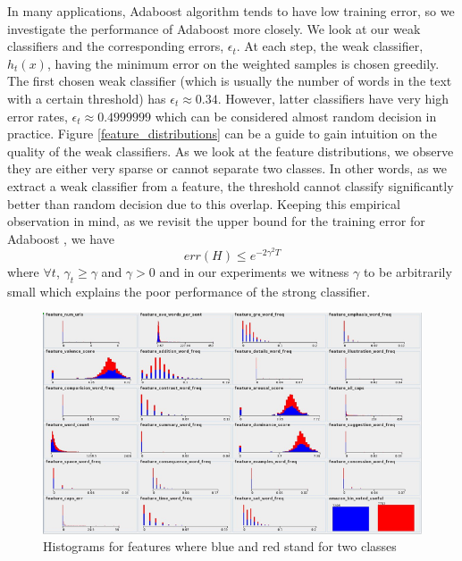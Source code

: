 \documentclass[letterpaper]{article}
\begin{document}
In many applications, Adaboost algorithm tends to have low training
error, so we investigate the performance of Adaboost more closely. We
look at our weak classifiers and the corresponding errors,
$\epsilon_t$. At each step, the weak classifier, $h_t(x)$, having the
minimum error on the weighted samples is chosen greedily. The first
chosen weak classifier (which is usually the number of words in the
text with a certain threshold) has $\epsilon_t \approx 0.34$. However,
latter classifiers have very high error rates, $\epsilon_t \approx
0.4999999$ which can be considered almost random decision in
practice. Figure \ref{feature_distributions} can be a guide to gain
intuition on the quality of the weak classifiers. As we look at the
feature distributions, we observe they are either very sparse or
cannot separate two classes. In other words, as we extract a weak
classifier from a feature, the threshold cannot classify significantly
better than random decision due to this overlap. Keeping this
empirical observation in mind, as we revisit the upper bound for the
training error for Adaboost \cite{adaboost}\cite{adaboost2}, we have
\[
err(H) \leq e^{-2\gamma^2 T}
\]
where $\forall t$, $\gamma_t \geq \gamma $ and $\gamma > 0$ and in our
experiments we witness $\gamma$ to be arbitrarily small which explains
the poor performance of the strong classifier.

\begin{figure}[ht]
  \centering
  \includegraphics[scale=.5]{features_distributions}
  \caption{Histograms for features where blue and red stand for two classes}
  \label{fig:dist}
\end{figure}
\end{document}
